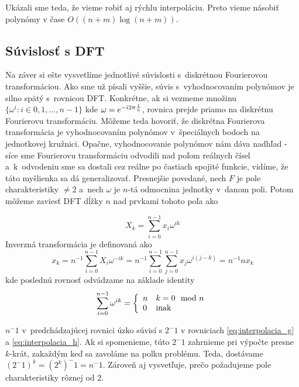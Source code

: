 Ukázali sme teda, že vieme robiť aj rýchlu interpoláciu. Preto vieme
násobiť polynómy v čase $O((n+m) \log (n+m))$.

\subsection{Súvislosť s DFT}
Na záver si ešte vysvetlíme jednotlivé súvislosti s~diskrétnou
Fourierovou transformáciou. Ako sme už písali vyššie, súvis
s~vyhodnocovaním polynómov je silno spätý s~rovnicou DFT.
Konkrétne, ak si vezmeme množinu 
$\{ \omega^i: i \in 0,1,\dots,n-1\}$ kde $\omega = e^{-\hat{\imath} 2 \pi
\frac{1}{n}}$, rovnica  prejde priamo na diskrétnu Fourierovu
transformáciu. Môžeme teda hovoriť, že diskrétna Fourierova
transformácia je vyhodnocovaním polynómov v~špeciálnych bodoch na
jednotkovej kružnici. Opačne, vyhodnocovanie polynómov nám dáva
nadhľad - síce sme Fourierovu transformáciu odvodili nad poľom
reálnych čísel a~k~odvodeniu sme sa dostali cez reálne po častiach
spojité funkcie, vidíme, že táto myšlienka sa dá generalizovať.
Presnejšie povedané, nech $F$ je pole charakteristiky $\not=2$ a~nech
$\omega$ je $n$-tá odmocnina jednotky v~danom poli.
Potom môžeme zaviesť DFT dĺžky $n$ nad prvkami tohoto poľa ako

\begin{equation*}
    X_k = \sum_{i=0}^{n-1} x_i \omega^{ik}
\end{equation*}
Inverzná transformácia je definovaná ako
\begin{equation*}
    x_k = n^{-1} \sum_{i=0}^{n-1} X_i \omega^{-ik}
        = n^{-1} \sum_{i=0}^{n-1} \sum_{j=0}^{n-1} 
            x_j \omega^{i(j-k)}
        = n^{-1} n x_k
\end{equation*}
kde poslednú rovnosť odvádzame na základe identity
\begin{equation*}
    \sum_{i=0}^{n-1} \omega^{ik} = \left\{
        \begin{array}{l l}
            n& k=0 \mod n\\
            0& \text{inak}
        \end{array}
        \right.
\end{equation*}
\begin{poznamka}
    $n^-1$ v~predchádzajúcej rovnici úzko súvisí s $2^-1$ v rovniciach
    \eqref{eq:interpolacia_g} a \eqref{eq:interpolacia_h}. Ak si
    spomenieme, túto $2^-1$ zahrnieme pri výpočte presne $k$-krát,
    zakaždým keď sa zavoláme na polku problému. Teda, dostávame
    $(2^-1)^k = (2^k)^-1 = n^-1$. Zároveň aj vysvetľuje, prečo
    požadujeme pole charakteristiky rôznej od 2.
\end{poznamka}

\nocite{pollard}
\nocite{compalg}
\nocite{practical_fast_multiplication}
